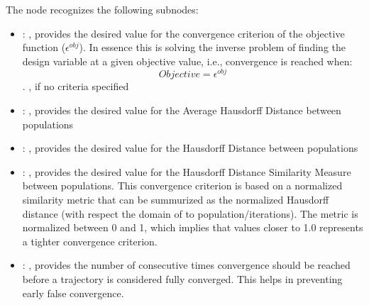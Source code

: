 \begin{itemize}
      The  node recognizes the following subnodes:
      \begin{itemize}
        \item {}: ,
          provides the desired value for the convergence criterion of the objective function
          ($\epsilon^{obj}$). In essence this is solving the inverse problem of finding the design
          variable                         at a given objective value, i.e., convergence is reached
          when: $$ Objective = \epsilon^{obj}$$.                        , if no
          criteria specified

        \item {}: ,
          provides the desired value for the Average Hausdorff Distance between populations

        \item {}: ,
          provides the desired value for the Hausdorff Distance between populations

        \item {}: ,
          provides the desired value for the Hausdorff Distance Similarity Measure between
          populations.                                     This convergence criterion is based on a
          normalized                                     similarity metric that can be summurized as
          the normalized Hausdorff distance                                     (with respect the
          domain of to population/iterations). The metric is normalized between 0 and 1,
          which implies that values closer to 1.0 represents a tighter convergence criterion.

        \item {}: ,
          provides the number of consecutive times convergence should be reached before a trajectory
          is considered fully converged. This helps in preventing early false convergence.
      \end{itemize}


\end{itemize}
